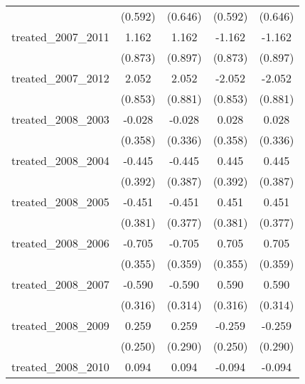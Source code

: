 {\begin{tabular}{l*{4}{c}}
            &     (0.592)         &     (0.646)         &     (0.592)         &     (0.646)         \\
[1em]
treated\_2007\_2011&       1.162         &       1.162         &      -1.162         &      -1.162         \\
            &     (0.873)         &     (0.897)         &     (0.873)         &     (0.897)         \\
[1em]
treated\_2007\_2012&       2.052\sym{*}  &       2.052\sym{*}  &      -2.052\sym{*}  &      -2.052\sym{*}  \\
            &     (0.853)         &     (0.881)         &     (0.853)         &     (0.881)         \\
[1em]
treated\_2008\_2003&      -0.028         &      -0.028         &       0.028         &       0.028         \\
            &     (0.358)         &     (0.336)         &     (0.358)         &     (0.336)         \\
[1em]
treated\_2008\_2004&      -0.445         &      -0.445         &       0.445         &       0.445         \\
            &     (0.392)         &     (0.387)         &     (0.392)         &     (0.387)         \\
[1em]
treated\_2008\_2005&      -0.451         &      -0.451         &       0.451         &       0.451         \\
            &     (0.381)         &     (0.377)         &     (0.381)         &     (0.377)         \\
[1em]
treated\_2008\_2006&      -0.705\sym{*}  &      -0.705\sym{*}  &       0.705\sym{*}  &       0.705\sym{*}  \\
            &     (0.355)         &     (0.359)         &     (0.355)         &     (0.359)         \\
[1em]
treated\_2008\_2007&      -0.590         &      -0.590         &       0.590         &       0.590         \\
            &     (0.316)         &     (0.314)         &     (0.316)         &     (0.314)         \\
[1em]
treated\_2008\_2009&       0.259         &       0.259         &      -0.259         &      -0.259         \\
            &     (0.250)         &     (0.290)         &     (0.250)         &     (0.290)         \\
[1em]
treated\_2008\_2010&       0.094         &       0.094         &      -0.094         &      -0.094         \\

\end{tabular}}
